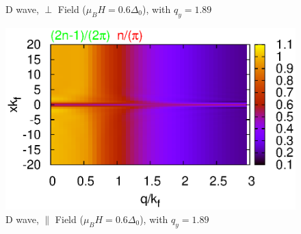 \documentclass[aps,prl,twocolumn,showpacs,amsmath,amssymb]{revtex4-1}
\begin{document}
\begin{widetext}
\begin{figure}
\caption{ 
	\label{fig:qq} D wave, $\perp$ Field ($\mu_B H=0.6\Delta_0$), with $q_y = 1.89$
} 
\end{figure}
\begin{figure}
\includegraphics[width=0.7\linewidth]{surface_para_d_Fql.eps}
\caption{ 
	\label{fig:qq} D wave, $\parallel$ Field ($\mu_B H=0.6\Delta_0$), with $q_y = 1.89$
} 
\end{figure}
\end{widetext}



\end{document}
